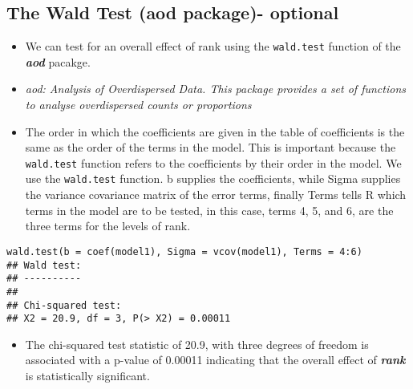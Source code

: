 \documentclass[]{article}
\begin{document}
\subsection{The Wald Test (aod package)- optional}
\begin{itemize}
\item We can test for an overall effect of rank using the \texttt{wald.test} function of the \textbf{\textit{aod}} pacakge. 
\item \textit{aod: Analysis of Overdispersed Data. This package provides a set of functions to analyse overdispersed counts or proportions}
\item The order in which the coefficients are given in the table of coefficients is the same as the order of the terms in the model. This is important because the \texttt{wald.test} function refers to the coefficients by their order in the model. We use the \texttt{wald.test} function. b supplies the coefficients, while Sigma supplies the variance covariance matrix of the error terms, finally Terms tells R which terms in the model are to be tested, in this case, terms 4, 5, and 6, are the three terms for the levels of rank.
\end{itemize}
\begin{framed}
\begin{verbatim}
wald.test(b = coef(model1), Sigma = vcov(model1), Terms = 4:6)
## Wald test:
## ----------
## 
## Chi-squared test:
## X2 = 20.9, df = 3, P(> X2) = 0.00011
\end{verbatim}
\end{framed}
\begin{itemize}
\item The chi-squared test statistic of 20.9, with three degrees of freedom is associated with a p-value of 0.00011 indicating that the overall effect of \textbf{\textit{rank}} is statistically significant.
\end{itemize}
\newpage
\end{document}
